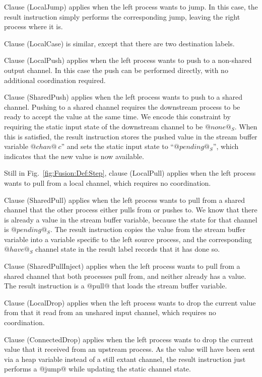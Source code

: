 Clause (LocalJump) applies when the left process wants to jump.
In this case, the result instruction simply performs the corresponding jump, leaving the right process where it is. 

Clause (LocalCase) is similar, except that there are two destination labels.

Clause (LocalPush) applies when the left process wants to push to a non-shared output channel.
In this case the push can be performed directly, with no additional coordination required.

Clause (SharedPush) applies when the left process wants to push to a shared channel. Pushing to a shared channel requires the downstream process to be ready to accept the value at the same time. We encode this constraint by requiring the static input state of the downstream channel to be $@none@_S$. When this is satisfied, the result instruction stores the pushed value in the stream buffer variable $@chan@~c$'' and sets the static input state to ``$@pending@_S$'', which indicates that the new value is now available. 

\eject{}
Still in Fig.~\ref{fig:Fusion:Def:Step}, clause (LocalPull) applies when the left process wants to pull from a local channel, which requires no coordination.

Clause (SharedPull) applies when the left process wants to pull from a shared channel that the other process either pulls from or pushes to. We know that there is already a value in the stream buffer variable, because the state for that channel is $@pending@_S$. The result instruction copies the value from the stream buffer variable into a variable specific to the left source process, and the corresponding $@have@_S$ channel state in the result label records that it has done so.

Clause (SharedPullInject) applies when the left process wants to pull from a shared channel that both processes pull from, and neither already has a value. The result instruction is a @pull@ that loads the stream buffer variable.

Clause (LocalDrop) applies when the left process wants to drop the current value from that it read from an unshared input channel, which requires no coordination.

Clause (ConnectedDrop) applies when the left process wants to drop the current value that it received from an upstream process. As the value will have been sent via a heap variable instead of a still extant channel, the result instruction just performs a @jump@ while updating the static channel state.

